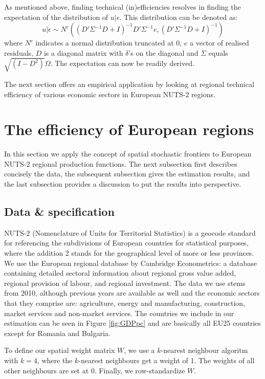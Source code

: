 \documentclass[11pt,parskip,abstracton,notitlepage]{scrartcl}
\begin{document}
As mentioned above, finding technical (in)efficiencies resolves in finding the expectation of the distribution of $u|\epsilon$. This distribution can be denoted as:
\begin{equation}
u|\epsilon \sim N^c\left(\left(D'\Sigma^{-1}D+I\right)^{-1}D'\Sigma^{-1}e,
 \left(D'\Sigma^{-1}D+I\right)^{-1} \right)
\label{eq:TE}
\end{equation}
where $N^c$ indicates a normal distribution truncated at $0$, $e$ a vector of realised residuals, $D$ is a diagonal matrix with $\delta$'s on the diagonal and $\Sigma$ equals $\sqrt{(I - D^2)}\Omega$. The expectation can now be readily derived. 

The next section offers an empirical application by looking at regional technical efficiency of various economic sectors in European NUTS-2 regions.
%
\section{The efficiency of European regions\label{sec:Applications}}
%
In this section we apply the concept of spatial stochastic frontiers to European NUTS-2 regional production functions. The next subsection first describes concisely the data, the subsequent subsection gives the estimation results, and the last subsection provides a discussion to put the results into perspective. 
%
\subsection{Data \& specification}
%
NUTS-2 (Nomenclature of Units for Territorial Statistics) is a geocode standard for referencing the subdivisions of European countries for statistical purposes, where the addition 2 stands for the geographical level of more or less provinces. We use the European regional database by Cambridge Econometrics: a database containing detailed sectoral information about regional gross value added, regional provision of labour, and regional investment. The data we use stems from 2010, although previous years are available as well and the economic sectors that they comprise are: agriculture, energy and manufacturing, construction, market services and non-market services. The countries we include in our estimation can be seen in Figure \ref{fig:GDPpc} and are basically all EU25 countries except for Romania and Bulgaria. 

To define our spatial weight matrix $W$, we use a $k$-nearest neighbour algoritm with $k = 4$, where the $k$-nearest neighbours get a weight of 1. The weights of all other neighbours are set at 0. Finally, we row-standardize $W$. 
\end{document}
